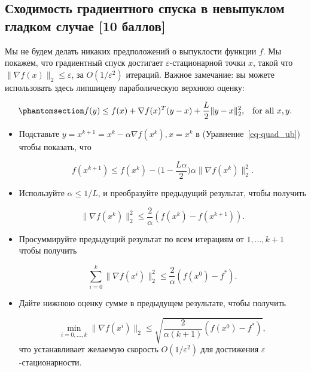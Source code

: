 \documentclass[
  russian,
  letterpaper,
  DIV=11,
  numbers=noendperiod]{scrartcl}
\begin{document}
\subsection{\texorpdfstring{\textbf{Сходимость градиентного спуска в
невыпуклом гладком случае} {[}10
баллов{]}}{Сходимость градиентного спуска в невыпуклом гладком случае {[}10 баллов{]}}}\label{ux441ux445ux43eux434ux438ux43cux43eux441ux442ux44c-ux433ux440ux430ux434ux438ux435ux43dux442ux43dux43eux433ux43e-ux441ux43fux443ux441ux43aux430-ux432-ux43dux435ux432ux44bux43fux443ux43aux43bux43eux43c-ux433ux43bux430ux434ux43aux43eux43c-ux441ux43bux443ux447ux430ux435-10-ux431ux430ux43bux43bux43eux432}

Мы не будем делать никаких предположений о выпуклости функции \(f\). Мы
покажем, что градиентный спуск достигает \(\varepsilon\)-стационарной
точки \(x\), такой что \(\|\nabla f(x)\|_2 \leq \varepsilon\), за
\(O(1/\varepsilon^2)\) итераций. Важное замечание: вы можете
использовать здесь липшицеву параболическую верхнюю оценку:

\begin{equation}\phantomsection\label{eq-quad_ub}{
f(y) \leq f(x) + \nabla f(x)^T (y-x) + \frac{L}{2} \|y-x\|_2^2, \;\;\;
\text{for all $x,y$}.  
}\end{equation}

\begin{itemize}
\item
  Подставьте \(y = x^{k+1} = x^{k} - \alpha \nabla f(x^k), x = x^k\) в
  (Уравнение~\ref{eq-quad_ub}) чтобы показать, что

  \[
    f(x^{k+1}) \leq f(x^k) - \Big (1-\frac{L\alpha}{2} \Big) \alpha \|\nabla f(x^k)\|_2^2.
    \]
\item
  Используйте \(\alpha \leq 1/L\), и преобразуйте предыдущий результат,
  чтобы получить

  \[
    \|\nabla f(x^k)\|_2^2 \leq \frac{2}{\alpha} \left( f(x^k) - f(x^{k+1}) \right).
    \]
\item
  Просуммируйте предыдущий результат по всем итерациям от
  \(1,\ldots,k+1\) чтобы получить

  \[
    \sum_{i=0}^k \|\nabla f(x^{i})\|_2^2 \leq 
    \frac{2}{\alpha} ( f(x^{0}) - f^*).
    \]
\item
  Дайте нижнюю оценку сумме в предыдущем результате, чтобы получить

  \[
    \min_{i=0,\ldots,k} \|\nabla f(x^{i}) \|_2 
    \leq \sqrt{\frac{2}{\alpha(k+1)} (f(x^{0}) - f^*)}, 
    \] что устанавливает желаемую скорость \(O(1/\varepsilon^2)\) для
  достижения \(\varepsilon\)-стационарности.
\end{itemize}
\end{document}
